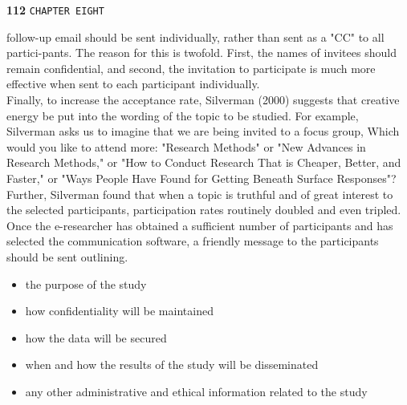 \documentclass[a4]{book}
\begin{document}
\begin{flushleft}
\hspace*{-0.5cm} \textbf{112}\hspace*{1cm} \texttt{CHAPTER EIGHT}
\end{flushleft}

\vspace*{0.5cm}
follow-up email should be sent individually, rather than sent as a "CC" to all partici-pants. The reason for this is twofold. First, the names of invitees should remain confidential, and second, the invitation to participate is much more effective when sent to each participant individually.\\
\hspace*{0.7cm} Finally, to increase the acceptance rate, Silverman (2000) suggests that creative energy be put into the wording of the topic to be studied. For example, Silverman asks us to imagine that we are being invited to a focus group, Which would you like to attend more: "Research Methods" or "New Advances in Research Methods," or "How to Conduct Research That is Cheaper, Better, and Faster," or "Ways People Have Found for Getting Beneath Surface Responses"? Further, Silverman found that when a topic is truthful and of great interest to the selected participants, participation rates routinely doubled and even tripled.\\
\hspace*{0.7cm} Once the e-researcher has obtained a sufficient number of participants and has selected the communication software, a friendly message to the participants should be sent outlining.\\

\vspace*{0.3cm}
\begin{itemize}
  \item the purpose of the study\\
  \item how confidentiality will be maintained\\
  \item how the data will be secured\\
  \item when and how the results of the study will be disseminated \\
  \item any other administrative and ethical information related to the study \\
\end{itemize}
\end{document}
